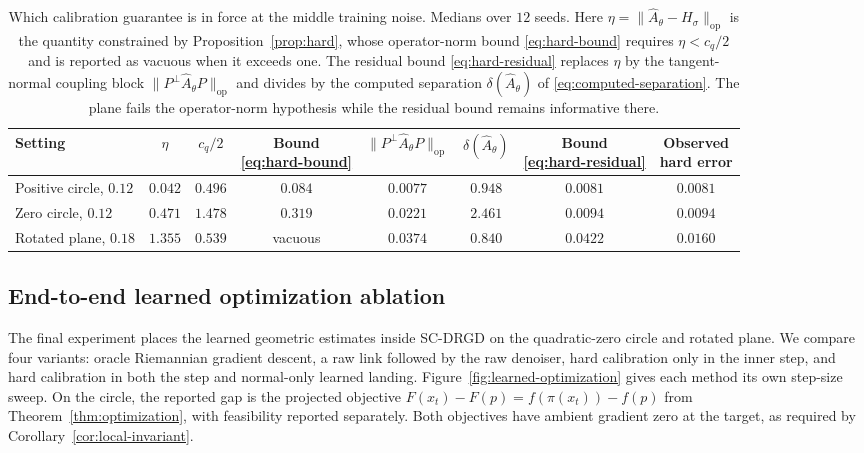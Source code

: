 \documentclass[10pt]{article}
\theoremstyle{c2fup}
\newcommand{\op}{\mathrm{op}}
\begin{document}
\begin{table}[!htbp]
  \centering
  \caption{Which calibration guarantee is in force at the middle training noise.  Medians over $12$ seeds.  Here $\eta=\|\widehat A_\theta-H_\sigma\|_\op$ is the quantity constrained by Proposition~\ref{prop:hard}, whose operator-norm bound \eqref{eq:hard-bound} requires $\eta<c_q/2$ and is reported as vacuous when it exceeds one.  The residual bound \eqref{eq:hard-residual} replaces $\eta$ by the tangent-normal coupling block $\|P^\perp\widehat A_\theta P\|_\op$ and divides by the computed separation $\delta(\widehat A_\theta)$ of \eqref{eq:computed-separation}.  The plane fails the operator-norm hypothesis while the residual bound remains informative there.}
  \label{tab:calibration-regime}
  \small
  \setlength{\tabcolsep}{4pt}
  \begin{tabular}{@{}lccccccc@{}}
    \toprule
    Setting & $\eta$ & $c_q/2$ & \shortstack{Bound\\\eqref{eq:hard-bound}}
      & $\|P^\perp\widehat A_\theta P\|_\op$ & $\delta(\widehat A_\theta)$
      & \shortstack{Bound\\\eqref{eq:hard-residual}}
      & \shortstack{Observed\\hard error} \\
    \midrule
    Positive circle, $0.12$
      & $0.042$ & $0.496$ & $0.084$
      & $0.0077$ & $0.948$ & $0.0081$ & $0.0081$ \\
    Zero circle, $0.12$
      & $0.471$ & $1.478$ & $0.319$
      & $0.0221$ & $2.461$ & $0.0094$ & $0.0094$ \\
    Rotated plane, $0.18$
      & $1.355$ & $0.539$ & vacuous
      & $0.0374$ & $0.840$ & $0.0422$ & $0.0160$ \\
    \bottomrule
  \end{tabular}
\end{table}

\subsection{End-to-end learned optimization ablation}

The final experiment places the learned geometric estimates inside SC-DRGD on the quadratic-zero circle and rotated plane.  We compare four variants: oracle Riemannian gradient descent, a raw link followed by the raw denoiser, hard calibration only in the inner step, and hard calibration in both the step and normal-only learned landing.  Figure~\ref{fig:learned-optimization} gives each method its own step-size sweep.  On the circle, the reported gap is the projected objective $F(x_t)-F(p)=f(\pi(x_t))-f(p)$ from Theorem~\ref{thm:optimization}, with feasibility reported separately.  Both objectives have ambient gradient zero at the target, as required by Corollary~\ref{cor:local-invariant}.
\end{document}
